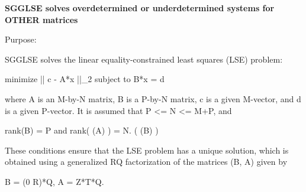 {\bfseries  S\+G\+G\+L\+S\+E solves overdetermined or underdetermined systems for O\+T\+H\+E\+R matrices} 

 \begin{DoxyParagraph}{Purpose\+: }
\begin{DoxyVerb} SGGLSE solves the linear equality-constrained least squares (LSE)
 problem:

         minimize || c - A*x ||_2   subject to   B*x = d

 where A is an M-by-N matrix, B is a P-by-N matrix, c is a given
 M-vector, and d is a given P-vector. It is assumed that
 P <= N <= M+P, and

          rank(B) = P and  rank( (A) ) = N.
                               ( (B) )

 These conditions ensure that the LSE problem has a unique solution,
 which is obtained using a generalized RQ factorization of the
 matrices (B, A) given by

    B = (0 R)*Q,   A = Z*T*Q.\end{DoxyVerb}
 
\end{DoxyParagraph}

